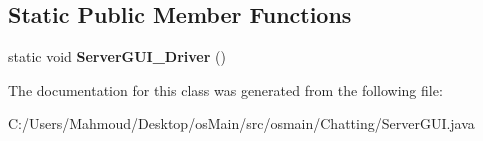 \subsection*{Static Public Member Functions}
\begin{DoxyCompactItemize}
\item 
static void {\bfseries Server\+G\+U\+I\+\_\+\+Driver} ()\hypertarget{classosmain_1_1_chatting_1_1_server_g_u_i_a8e764bc74ca519bba8d77e305ace734d}{}\label{classosmain_1_1_chatting_1_1_server_g_u_i_a8e764bc74ca519bba8d77e305ace734d}

\end{DoxyCompactItemize}


The documentation for this class was generated from the following file\+:\begin{DoxyCompactItemize}
\item 
C\+:/\+Users/\+Mahmoud/\+Desktop/os\+Main/src/osmain/\+Chatting/Server\+G\+U\+I.\+java\end{DoxyCompactItemize}
